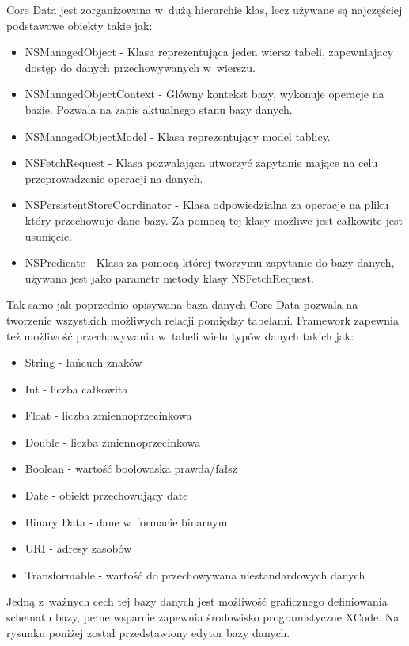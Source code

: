 Core Data jest zorganizowana w~dużą hierarchie klas, lecz używane są najczęściej podstawowe obiekty takie jak: 

\begin{itemize}
	\item NSManagedObject - Klasa reprezentująca jeden wiersz tabeli, zapewniajacy dostęp do danych przechowywanych w~wierszu.
	\item NSManagedObjectContext - Główny kontekst bazy, wykonuje operacje na bazie. Pozwala na zapis aktualnego stanu bazy danych.
	\item NSManagedObjectModel	- Klasa reprezentujący model tablicy. 
	\item NSFetchRequest - Klasa pozwalająca utworzyć zapytanie mające na celu przeprowadzenie operacji na danych.
	\item NSPersistentStoreCoordinator - Klasa odpowiedzialna za operacje na pliku który przechowuje dane bazy. Za pomocą tej klasy możliwe jest całkowite jest usunięcie. 
	\item NSPredicate - Klasa za pomocą której tworzymu zapytanie do bazy danych, używana jest jako parametr metody klasy NSFetchRequest.
\end{itemize}

Tak samo jak poprzednio opisywana baza danych Core Data pozwala na tworzenie wszystkich możliwych relacji pomiędzy tabelami. Framework zapewnia też możliwość przechowywania w~tabeli wielu typów danych takich jak: 

\begin{itemize}
	\item String - łańcuch znaków
	\item Int - liczba całkowita
	\item Float - liczba zmiennoprzecinkowa
	\item Double  - liczba zmiennoprzecinkowa
	\item Boolean - wartość boolowaska prawda/fałsz 
	\item Date - obiekt przechowujący date
	\item Binary Data - dane w~formacie binarnym 
	\item URI - adresy zasobów
	\item Transformable - wartość do przechowywana niestandardowych danych 
\end{itemize}

Jedną z~ważnych cech tej bazy danych jest możliwość graficznego definiowania schematu bazy, pełne wsparcie zapewnia środowisko programistyczne XCode. Na rysunku  poniżej został przedstawiony edytor bazy danych. \par

